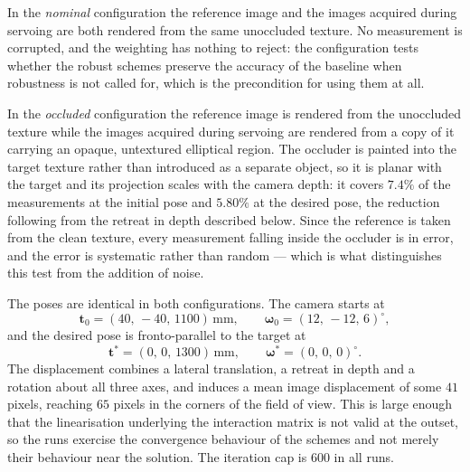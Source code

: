 In the \emph{nominal} configuration the reference image and the images
acquired during servoing are both rendered from the same unoccluded texture.
No measurement is corrupted, and the weighting has nothing to reject: the
configuration tests whether the robust schemes preserve the accuracy of the
baseline when robustness is not called for, which is the precondition for
using them at all.

In the \emph{occluded} configuration the reference image is rendered from the
unoccluded texture while the images acquired during servoing are rendered
from a copy of it carrying an opaque, untextured elliptical region. The
occluder is painted into the target texture rather than introduced as a
separate object, so it is planar with the target and its projection scales
with the camera depth: it covers $7.4\%$ of the measurements at the initial
pose and $5.80\%$ at the desired pose, the reduction following from the
retreat in depth described below. Since the reference is taken from the clean
texture, every measurement falling inside the occluder is in error, and the
error is systematic rather than random --- which is what distinguishes this
test from the addition of noise.

The poses are identical in both configurations. The camera starts at
\begin{equation*}
    \mathbf{t}_{0}=(40,\,-40,\,1100)\,\mathrm{mm},
    \qquad
    \boldsymbol{\omega}_{0}=(12,\,-12,\,6)^{\circ},
\end{equation*}
and the desired pose is fronto-parallel to the target at
\begin{equation*}
    \mathbf{t}^{*}=(0,\,0,\,1300)\,\mathrm{mm},
    \qquad
    \boldsymbol{\omega}^{*}=(0,\,0,\,0)^{\circ} .
\end{equation*}
The displacement combines a lateral translation, a retreat in depth and a
rotation about all three axes, and induces a mean image displacement of some
$41$ pixels, reaching $65$ pixels in the corners of the field of view.
This is large enough that the linearisation underlying the interaction matrix
is not valid at the outset, so the runs exercise the convergence behaviour of
the schemes and not merely their behaviour near the solution. The iteration
cap is $600$ in all runs.



